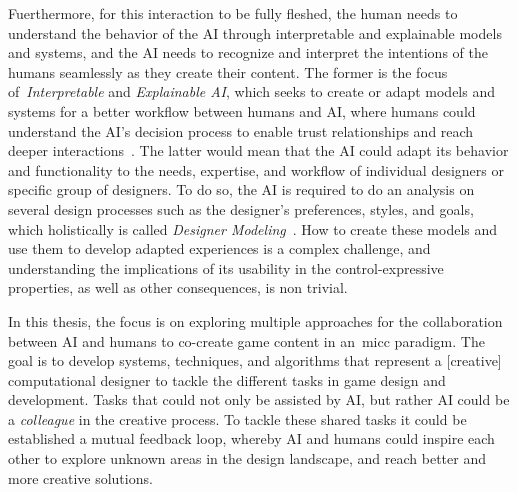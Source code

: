 
Fuerthermore, for this interaction to be fully fleshed, the human needs to understand the behavior of the AI through interpretable and explainable models and systems, and the AI needs to recognize and interpret the intentions of the humans seamlessly as they create their content. The former is the focus of~\emph{Interpretable} and \emph{Explainable AI}, which seeks to create or adapt models and systems for a better workflow between humans and AI, where humans could understand the AI's decision process to enable trust relationships and reach deeper interactions~\cite{Zhu2018-XAIDesignersMICC,Doshi-Velez2018,adadi2018peeking}. The latter would mean that the AI could adapt its behavior and functionality to the needs, expertise, and workflow of individual designers or specific group of designers. To do so, the AI is required to do an analysis on several design processes such as the designer's preferences, styles, and goals, which holistically is called \emph{Designer Modeling}~\cite{Liapis2013-designerModel,Liapis2014-designerModelImpl}. How to create these models and use them to develop adapted experiences is a complex challenge, and understanding the implications of its usability in the control-expressive properties, as well as other consequences, is non trivial.

In this thesis, the focus is on exploring multiple approaches for the collaboration between AI and humans to co-create game content in an~\acrlong{micc} paradigm. The goal is to develop systems, techniques, and algorithms that represent a [creative] computational designer to tackle the different tasks in game design and development. Tasks that could not only be assisted by AI, but rather AI could be a \emph{colleague} in the creative process. To tackle these shared tasks it could be established a mutual feedback loop, whereby AI and humans could inspire each other to explore unknown areas in the design landscape, and reach better and more creative solutions.



